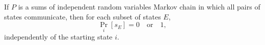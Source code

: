 If $P$ is a sums of independent random variables Markov chain in which all pairs of states communicate, then for each subset of states $E$,
$$\Pr_i[s_E] = 0 \quad\text{or}\quad 1,$$
independently of the starting state $i$.
